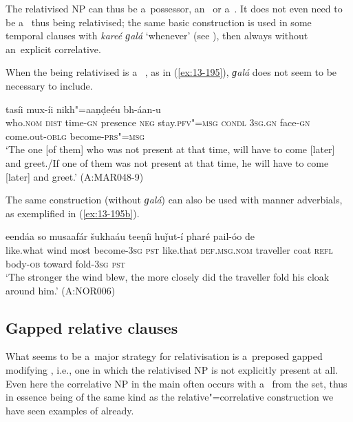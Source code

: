

The relativised NP can thus be a~possessor, an~  or a~. It does not even need to be a~  thus being relativised; the same basic construction is used in some temporal clauses with \textit{kareé ɡalá} `whenever' (see ), then always without an~explicit correlative.


When the   being relativised is a~ , as in (\ref{ex:13-195}), \textit{ɡalá} does not seem to be necessary to include. 

\begin{exe}
\ex
\label{ex:13-195}
 tasíi mux-íi nikh"=aaṇḍeéu bh-áan-u \\
who.\textsc{nom} \textsc{dist} time-\textsc{gn} presence \textsc{neg} stay.\textsc{pfv"=msg}  \textsc{condl } \textsc{3sg.gn} face-\textsc{gn} come.out-\textsc{oblg} become-\textsc{prs"=msg} \\
\glt `The one [of them] who was not present at that time, will have to come [later] and greet./If one of them was not present at that time, he will have to come [later] and greet.' (A:MAR048-9)
\end{exe}

The same construction (without \textit{ɡalá}) can also be used with manner adverbials, as exemplified in (\ref{ex:13-195b}).

\begin{exe}
\ex
\label{ex:13-195b}
 eendáa so musaafár šukhaáu teeṇíi huǰut-í pharé pail-óo de\\
like.what wind most become-\textsc{3sg} \textsc{pst} like.that \textsc{def.msg.nom} traveller coat \textsc{refl} body-\textsc{ob} toward fold-\textsc{3sg} \textsc{pst} \\
\glt `The stronger the wind blew, the more closely did the traveller fold his cloak around him.' (A:NOR006)
\end{exe}


\subsection{Gapped relative clauses}
\label{subsec:13-6-3}


What seems to be a~major strategy for relativisation is a~preposed gapped modifying , i.e., one in which the relativised NP is not explicitly present at all. Even here the correlative NP in the main  often occurs with a~ from the  set, thus in essence being of the same kind as the relative"=correlative construction we have seen examples of already.


